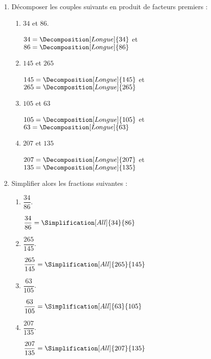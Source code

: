 \begin{corrige}
    \begin{enumerate}
        \item Décomposer les couples suivants en produit de facteurs premiers :
        
        \begin{enumerate}
            \item $34$ et $86$.
            
            {\red $34 = \Decomposition[Longue]{34}$ et $86 = \Decomposition[Longue]{86}$}
            \item $145$ et $265$
            
            {\red $145 = \Decomposition[Longue]{145}$ et $265 = \Decomposition[Longue]{265}$}
            \item $105$ et $63$
            
            {\red $105 = \Decomposition[Longue]{105}$ et $63 = \Decomposition[Longue]{63}$}
            \item $207$ et $135$
            
            {\red $207 = \Decomposition[Longue]{207}$ et $135 = \Decomposition[Longue]{135}$}
        \end{enumerate}
        \setcounter{enumi}{1}
        \item Simplifier alors les fractions suivantes :
        
        \begin{spacing}{2}
            \begin{enumerate}
                \item $\dfrac{34}{86}$.
                
                {\red $\dfrac{34}{86} = \displaystyle\Simplification[All]{34}{86}$}
                \item $\dfrac{265}{145}$.
                
                {\red $\dfrac{265}{145} = \displaystyle\Simplification[All]{265}{145}$}
                \item $\dfrac{63}{105}$.
                
                {\red $\dfrac{63}{105} = \displaystyle\Simplification[All]{63}{105}$}
                \item $\dfrac{207}{135}$.
                
                {\red $\dfrac{207}{135} = \displaystyle\Simplification[All]{207}{135}$}
            \end{enumerate}
        \end{spacing}
    \end{enumerate}                   
    
\end{corrige}

